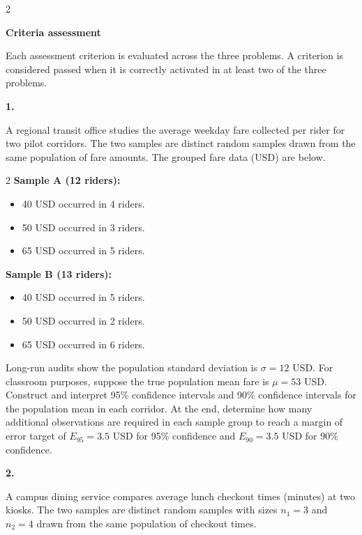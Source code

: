 \documentclass[12pt]{article}
\newcommand{\SubsectionBox}[1]{%
	\noindent\colorbox{gray!30}{%
		\parbox{\linewidth}{\textbf{#1}}%
	}\par\vspace{0.35cm}%
}
\begin{document}
	\begin{multicols}{2}
		\SubsectionBox{Criteria assessment}\vspace{-0.25cm}
		Each assessment criterion is evaluated across the three problems. A criterion is considered passed when it is correctly activated in at least two of the three problems.

		\vspace{0.25cm}
		\SubsectionBox{1.}\vspace{-0.25cm}
		A regional transit office studies the average weekday fare collected per rider for two pilot corridors.
		The two samples are distinct random samples drawn from the same population of fare amounts.
		The grouped fare data (USD) are below.

		\begin{multicols}{2}
			\textbf{Sample A (12 riders):}
			\begin{itemize}
				\item 40 USD occurred in 4 riders.
				\item 50 USD occurred in 3 riders.
				\item 65 USD occurred in 5 riders.
			\end{itemize}

			\columnbreak

			\textbf{Sample B (13 riders):}
			\begin{itemize}
				\item 40 USD occurred in 5 riders.
				\item 50 USD occurred in 2 riders.
				\item 65 USD occurred in 6 riders.
			\end{itemize}
		\end{multicols}

		Long-run audits show the population standard deviation is $\sigma = 12$ USD.
		For classroom purposes, suppose the true population mean fare is $\mu = 53$ USD.
		Construct and interpret 95\% confidence intervals and 90\% confidence intervals for the population mean in each corridor.
		At the end, determine how many additional observations are required in each sample group to reach a margin of error target of $E_{95} = 3.5$ USD for 95\% confidence and $E_{90} = 3.5$ USD for 90\% confidence.

		\vspace{0.25cm}
		\SubsectionBox{2.}\vspace{-0.25cm}
		A campus dining service compares average lunch checkout times (minutes) at two kiosks.
		The two samples are distinct random samples with sizes $n_1 = 3$ and $n_2 = 4$ drawn from the same population of checkout times.


\end{multicols}
\end{document}
